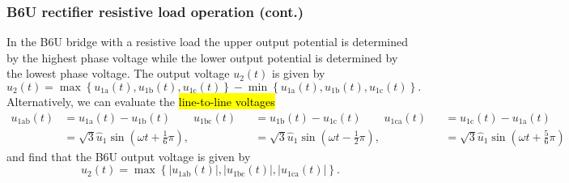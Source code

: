 \begin{frame}
	\frametitle{B6U rectifier resistive load operation (cont.)}
	In the B6U bridge with a resistive load the upper output potential is determined by the highest phase voltage while the lower output potential is determined by the lowest phase voltage. The output voltage $u_2(t)$ is given by
	\begin{equation}
		u_2(t) = \max\left\{u_{1\mathrm{a}}(t), u_{1\mathrm{b}}(t), u_{1\mathrm{c}}(t)\right\} - \min\left\{u_{1\mathrm{a}}(t), u_{1\mathrm{b}}(t), u_{1\mathrm{c}}(t)\right\}.
	\end{equation}
	\pause
	Alternatively, we can evaluate the \hl{line-to-line voltages}
	\begin{equation*}
		\begin{alignedat}{3}
			u_{1\mathrm{ab}}(t) & = u_{1\mathrm{a}}(t) - u_{1\mathrm{b}}(t) \qquad u_{1\mathrm{bc}}(t) &  & = u_{1\mathrm{b}}(t) - u_{1\mathrm{c}}(t) \qquad u_{1\mathrm{ca}}(t) &  & = u_{1\mathrm{c}}(t) - u_{1\mathrm{a}}(t)          \\
			                    & =\sqrt{3}\hat{u}_1\sin(\omega t + \frac{1}{6}\pi),                   &  & = \sqrt{3}\hat{u}_1\sin(\omega t - \frac{1}{2}\pi),                  &  & = \sqrt{3}\hat{u}_1\sin(\omega t + \frac{5}{6}\pi)
		\end{alignedat}
	\end{equation*}\pause
	and find that the B6U output voltage is given by
	\begin{equation}
		u_2(t) = \max\left\{|u_{1\mathrm{ab}}(t)|, |u_{1\mathrm{bc}}(t)|, |u_{1\mathrm{ca}}(t)|\right\}.
	\end{equation}
\end{frame}


